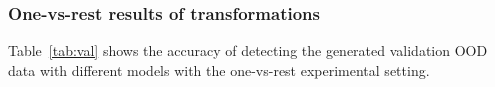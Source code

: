 \documentclass[12pt]{spieman}  %
\begin{document}
\begin{spacing}{2}
\subsubsection{One-vs-rest results of transformations}
Table~\ref{tab:val} shows the accuracy of detecting the generated validation OOD data with different models with the one-vs-rest experimental setting.
\begin{table} [htp]
\caption{Accuracy of various OOD detection methods trained on IVC-Filter~\cite{ni2020deep:ivc}, RSNA~\cite{wang2017chestx} and ISIC2019~\cite{codella2018skin} \textbf{with the one-vs-rest setting}. Bold denotes the best results and * indicates the model is supervised. }
\label{tab:val}
\end{table}
\end{spacing}
\end{document}

